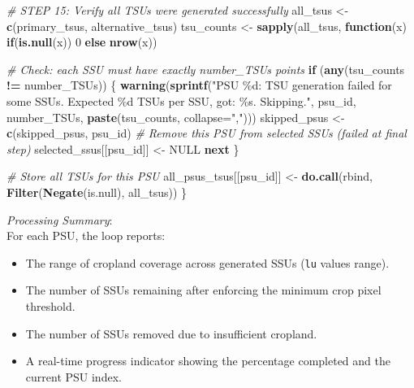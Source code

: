 \documentclass[
  10pt,
  b5paper,
  oneside]{book}
\newenvironment{Shaded}{\begin{snugshade}}{\end{snugshade}}
\newcommand{\AttributeTok}[1]{\textcolor[rgb]{0.13,0.29,0.53}{#1}}
\newcommand{\CommentTok}[1]{\textcolor[rgb]{0.56,0.35,0.01}{\textit{#1}}}
\newcommand{\ConstantTok}[1]{\textcolor[rgb]{0.56,0.35,0.01}{#1}}
\newcommand{\ControlFlowTok}[1]{\textcolor[rgb]{0.13,0.29,0.53}{\textbf{#1}}}
\newcommand{\DecValTok}[1]{\textcolor[rgb]{0.00,0.00,0.81}{#1}}
\newcommand{\FunctionTok}[1]{\textcolor[rgb]{0.13,0.29,0.53}{\textbf{#1}}}
\newcommand{\NormalTok}[1]{#1}
\newcommand{\OtherTok}[1]{\textcolor[rgb]{0.56,0.35,0.01}{#1}}
\newcommand{\SpecialCharTok}[1]{\textcolor[rgb]{0.81,0.36,0.00}{\textbf{#1}}}
\newcommand{\StringTok}[1]{\textcolor[rgb]{0.31,0.60,0.02}{#1}}
\providecommand{\tightlist}{%
  \setlength{\itemsep}{0pt}\setlength{\parskip}{0pt}}
\begin{document}
\begin{Shaded}
\begin{Highlighting}[]
  \CommentTok{\# STEP 15: Verify all TSUs were generated successfully}
\NormalTok{  all\_tsus }\OtherTok{\textless{}{-}} \FunctionTok{c}\NormalTok{(primary\_tsus, alternative\_tsus)}
\NormalTok{  tsu\_counts }\OtherTok{\textless{}{-}} \FunctionTok{sapply}\NormalTok{(all\_tsus, }\ControlFlowTok{function}\NormalTok{(x) }\ControlFlowTok{if}\NormalTok{(}\FunctionTok{is.null}\NormalTok{(x)) }\DecValTok{0} \ControlFlowTok{else} \FunctionTok{nrow}\NormalTok{(x))}
  
  \CommentTok{\# Check: each SSU must have exactly number\_TSUs points}
  \ControlFlowTok{if}\NormalTok{ (}\FunctionTok{any}\NormalTok{(tsu\_counts }\SpecialCharTok{!=}\NormalTok{ number\_TSUs)) \{}
    \FunctionTok{warning}\NormalTok{(}\FunctionTok{sprintf}\NormalTok{(}\StringTok{"PSU \%d: TSU generation failed for some SSUs. Expected \%d TSUs per SSU, got: \%s. Skipping."}\NormalTok{, }
\NormalTok{                    psu\_id, number\_TSUs, }\FunctionTok{paste}\NormalTok{(tsu\_counts, }\AttributeTok{collapse=}\StringTok{","}\NormalTok{)))}
\NormalTok{    skipped\_psus }\OtherTok{\textless{}{-}} \FunctionTok{c}\NormalTok{(skipped\_psus, psu\_id)}
    \CommentTok{\# Remove this PSU from selected SSUs (failed at final step)}
\NormalTok{    selected\_ssus[[psu\_id]] }\OtherTok{\textless{}{-}} \ConstantTok{NULL}
    \ControlFlowTok{next}
\NormalTok{  \}}
  
  \CommentTok{\# Store all TSUs for this PSU}
\NormalTok{  all\_psus\_tsus[[psu\_id]] }\OtherTok{\textless{}{-}} \FunctionTok{do.call}\NormalTok{(rbind, }\FunctionTok{Filter}\NormalTok{(}\FunctionTok{Negate}\NormalTok{(is.null), all\_tsus))}
\NormalTok{\}}
\end{Highlighting}
\end{Shaded}

\emph{Processing Summary}:\\
For each PSU, the loop reports:

\begin{itemize}
\tightlist
\item
  The range of cropland coverage across generated SSUs (\texttt{lu} values range).
\item
  The number of SSUs remaining after enforcing the minimum crop pixel threshold.
\item
  The number of SSUs removed due to insufficient cropland.
\item
  A real-time progress indicator showing the percentage completed and the current PSU index.
\end{itemize}
\end{document}

